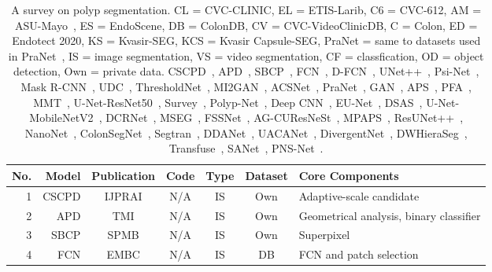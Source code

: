 \documentclass[journal]{IEEEtran}
\begin{document}
\begin{table*}[t!]
\small
  \centering
  \caption{
  A survey  on polyp segmentation. CL = CVC-CLINIC, EL = ETIS-Larib, C6 = CVC-612, AM = ASU-Mayo~\cite{zhou2017fine,tajbakhsh2016convolutional}, ES = EndoScene, DB = ColonDB, CV = CVC-VideoClinicDB, C = Colon, ED = Endotect 2020, KS = Kvasir-SEG, KCS = Kvasir Capsule-SEG, PraNet = same to datasets used in PraNet~\cite{fan2020pranet}, IS = image segmentation, VS = video segmentation, CF = classfication, OD = object detection, Own = private data. CSCPD~\cite{fiori2014complete}, APD~\cite{mamonov2014automated}, SBCP~\cite{maghsoudi2017superpixel}, FCN~\cite{akbari2018polyp}, D-FCN~\cite{brandao2018towards}, UNet++~\cite{zhou2018unet++}, Psi-Net~\cite{murugesan2019psi}, Mask R-CNN~\cite{qadir2019polyp}, UDC~\cite{sun2019colorectal}, ThresholdNet~\cite{guo2020learn}, MI2GAN~\cite{xie2020mi}, ACSNet~\cite{zhang2020ACSN}, PraNet~\cite{fan2020pranet}, GAN~\cite{ahmed2020generative}, APS~\cite{tomar2021automatic}, PFA~\cite{ThambawitaHHR20}, MMT~\cite{JhaHEJJLRH20}, U-Net-ResNet50~\cite{AlamTTJR20}, Survey~\cite{rahim2020survey}, Polyp-Net~\cite{banik2020polyp}, Deep CNN~\cite{rahim2021deep}, EU-Net~\cite{PatelBW21}, DSAS~\cite{lumini2021deep}, U-Net-MobileNetV2~\cite{branch2021polyp}, DCRNet~\cite{yin2021duplex}, MSEG~\cite{huang2021hardnet}, FSSNet~\cite{khadga2021few}, AG-CUResNeSt~\cite{sang2021ag}, MPAPS~\cite{yang2021mutual}, ResUNet++~\cite{JhaSJLJHR21}, NanoNet~\cite{jha2021nanonet}, ColonSegNet~\cite{jha2021real}, Segtran~\cite{segtran}, DDANet~\cite{tomar2020ddanet}, UACANet~\cite{kim2021uacanet}, DivergentNet~\cite{divergentNets}, DWHieraSeg~\cite{guo2021dynamic}, Transfuse~\cite{zhang2021transfuse}, SANet~\cite{wei2021shallow}, PNS-Net~\cite{ji2021pnsnet}.}
    \renewcommand{\arraystretch}{1.1}
    \setlength\tabcolsep{4.8pt}
    \begin{tabular}{r|r|c|c|c|c|l}
    \hline
    No. & Model & Publication & Code  & Type & Dataset & Core Components\\
    \hline   
    1&CSCPD & IJPRAI& N/A &   IS    & Own &  Adaptive-scale candidate \\

   2 &APD & TMI  & N/A &   IS    & Own &  Geometrical analysis, binary classifier\\
    
    3&SBCP & SPMB  & N/A &   IS    & Own &  Superpixel\\

    4&FCN & EMBC & N/A &   IS    & DB&  FCN and patch selection\\    
    

\end{tabular}
\end{table*}
\end{document}
